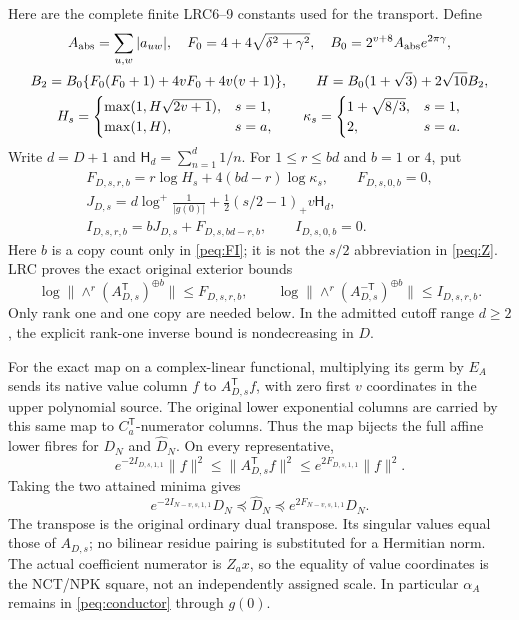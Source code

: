 \documentclass[11pt,a4paper]{article}
\begin{document}
Here are the complete finite LRC6--9 constants used for the transport. Define
\begin{equation}
\begin{gathered}
 A_{\rm abs}=\sum_{u,w}|a_{uw}|,\quad
 F_0=4+4\sqrt{\delta^2+\gamma^2},\quad
 B_0=2^{v+8}A_{\rm abs}e^{2\pi\gamma},\\
 B_2=B_0\{F_0(F_0+1)+4vF_0+4v(v+1)\},\qquad
 H=B_0(1+\sqrt3)+2\sqrt{10}B_2,\\
 H_s=\begin{cases}\max(1,H\sqrt{2v+1}),&s=1,\\
                 \max(1,H),&s=a,\end{cases}
 \qquad
 \kappa_s=\begin{cases}1+\sqrt{8/3},&s=1,\\2,&s=a.\end{cases}
\end{gathered}\label{peq:H}
\end{equation}
Write $d=D+1$ and $\mathsf H_d=\sum_{n=1}^d1/n$. For $1\le r\le bd$ and $b=1$ or $4$, put
\begin{equation}
\begin{gathered}
 F_{D,s,r,b}=r\log H_s+4(bd-r)\log\kappa_s,\qquad F_{D,s,0,b}=0,\\
 J_{D,s}=d\log^+\frac1{|g(0)|}
       +\tfrac12(s/2-1)_+v\mathsf H_d,\\
 I_{D,s,r,b}=bJ_{D,s}+F_{D,s,bd-r,b},\qquad I_{D,s,0,b}=0.
\end{gathered}\label{peq:FI}
\end{equation}
Here $b$ is a copy count only in \eqref{peq:FI}; it is not the $s/2$ abbreviation in \eqref{peq:Z}. LRC proves the exact original exterior bounds
\[
 \log\|\wedge^r(A_{D,s}^{\mathsf T})^{\oplus b}\|\le F_{D,s,r,b},
 \qquad
 \log\|\wedge^r(A_{D,s}^{-\mathsf T})^{\oplus b}\|\le I_{D,s,r,b}.
\]
Only rank one and one copy are needed below. In the admitted cutoff range $d\ge2$, the explicit rank-one inverse bound is nondecreasing in $D$.

For the exact map on a complex-linear functional, multiplying its germ by $E_A$ sends its native value column $f$ to $A_{D,s}^{\mathsf T}f$, with zero first $v$ coordinates in the upper polynomial source. The original lower exponential columns are carried by this same map to $C_a^{\mathsf T}$-numerator columns. Thus the map bijects the full affine lower fibres for $D_N$ and $\widehat D_N$. On every representative,
\[
 e^{-2I_{D,s,1,1}}\|f\|^2\le
      \|A_{D,s}^{\mathsf T}f\|^2
       \le e^{2F_{D,s,1,1}}\|f\|^2.
\]
Taking the two attained minima gives
\begin{equation}
 \boxed{e^{-2I_{N-v,s,1,1}}D_N
 \preceq\widehat D_N\preceq e^{2F_{N-v,s,1,1}}D_N.}
 \label{peq:native-transfer}
\end{equation}
The transpose is the original ordinary dual transpose. Its singular values equal those of $A_{D,s}$; no bilinear residue pairing is substituted for a Hermitian norm. The actual coefficient numerator is $Z_ax$, so the equality of value coordinates is the NCT/NPK square, not an independently assigned scale. In particular $\alpha_A$ remains in \eqref{peq:conductor} through $g(0)$.
\end{document}
